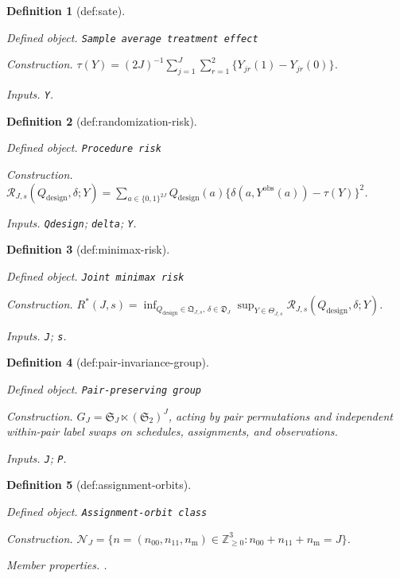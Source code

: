 \documentclass{article}
\newtheorem{definition}{Definition}
\begin{document}
\begin{definition}[def:sate]\label{def:sate}
\par\smallskip\noindent\emph{Defined object.} \texttt{Sample average treatment effect}
\par\smallskip\noindent\emph{Construction.} \(\tau(Y)=(2J)^{-1}\sum_{j=1}^J\sum_{r=1}^2\{Y_{jr}(1)-Y_{jr}(0)\}\).
\par\smallskip\noindent\emph{Inputs.} \texttt{Y}.
\end{definition}

\begin{definition}[def:randomization-risk]\label{def:randomization-risk}
\par\smallskip\noindent\emph{Defined object.} \texttt{Procedure risk}
\par\smallskip\noindent\emph{Construction.} \(\mathcal R_{J,s}(Q_{\mathrm{design}},\delta;Y)=\sum_{a\in\{0,1\}^{2J}}Q_{\mathrm{design}}(a)\{\delta(a,Y^{\mathrm{obs}}(a))-\tau(Y)\}^2\).
\par\smallskip\noindent\emph{Inputs.} \texttt{Qdesign}; \texttt{delta}; \texttt{Y}.
\end{definition}

\begin{definition}[def:minimax-risk]\label{def:minimax-risk}
\par\smallskip\noindent\emph{Defined object.} \texttt{Joint minimax risk}
\par\smallskip\noindent\emph{Construction.} \(R^*(J,s)=\inf_{Q_{\mathrm{design}}\in\mathfrak Q_{J,s},\,\delta\in\mathfrak D_J}\sup_{Y\in\Theta_{J,s}}\mathcal R_{J,s}(Q_{\mathrm{design}},\delta;Y)\).
\par\smallskip\noindent\emph{Inputs.} \texttt{J}; \texttt{s}.
\end{definition}

\begin{definition}[def:pair-invariance-group]\label{def:pair-invariance-group}
\par\smallskip\noindent\emph{Defined object.} \texttt{Pair-\allowbreak{}preserving group}
\par\smallskip\noindent\emph{Construction.} \(G_J=\mathfrak S_J\ltimes(\mathfrak S_2)^J\), acting by pair permutations and independent within-pair label swaps on schedules, assignments, and observations.
\par\smallskip\noindent\emph{Inputs.} \texttt{J}; \texttt{P}.
\end{definition}

\begin{definition}[def:assignment-orbits]\label{def:assignment-orbits}
\par\smallskip\noindent\emph{Defined object.} \texttt{Assignment-\allowbreak{}orbit class}
\par\smallskip\noindent\emph{Construction.} \(\mathcal N_J=\{n=(n_{00},n_{11},n_{\mathrm m})\in\mathbb Z_{\ge0}^3:n_{00}+n_{11}+n_{\mathrm m}=J\}\).
\par\smallskip\noindent\emph{Member properties.} .
\end{definition}
\end{document}

